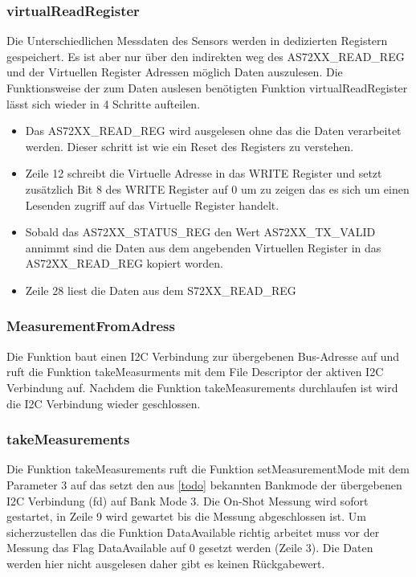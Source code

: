 \subsubsection{virtualReadRegister}
Die Unterschiedlichen Messdaten des Sensors werden in dedizierten Registern gespeichert.
 Es ist aber nur über den indirekten weg des AS72XX\_READ\_REG und der Virtuellen Register Adressen möglich Daten auszulesen.
Die Funktionsweise der zum Daten auslesen benötigten Funktion virtualReadRegister lässt sich wieder in 4 Schritte aufteilen.
\begin{itemize}
	\item Das AS72XX\_READ\_REG wird ausgelesen ohne das die Daten verarbeitet werden. Dieser schritt ist wie ein Reset des Registers zu verstehen.
	\item Zeile 12 schreibt die Virtuelle Adresse in das WRITE Register und setzt zusätzlich Bit 8 des WRITE Register auf 0 um zu zeigen das es sich um einen Lesenden zugriff auf das Virtuelle Register handelt.
	\item Sobald das AS72XX\_STATUS\_REG den Wert AS72XX\_TX\_VALID annimmt sind die Daten aus dem angebenden Virtuellen Register in das AS72XX\_READ\_REG kopiert worden.
	\item Zeile 28 liest die Daten aus dem S72XX\_READ\_REG
\end{itemize}


\subsubsection{MeasurementFromAdress}
Die Funktion baut einen I2C Verbindung zur übergebenen Bus-Adresse auf und  ruft die Funktion takeMeasurments mit dem File Descriptor der aktiven I2C Verbindung auf.
Nachdem die Funktion takeMeasurements durchlaufen ist wird die I2C Verbindung wieder geschlossen.


\subsubsection{takeMeasurements}

Die Funktion takeMeasurements ruft die Funktion setMeasurementMode mit dem Parameter 3 auf das setzt den aus \ref{todo} bekannten Bankmode der übergebenen I2C Verbindung (fd) auf Bank Mode 3.
	Die On-Shot Messung wird sofort gestartet, in Zeile 9 wird gewartet bis die Messung abgeschlossen ist. 
		Um sicherzustellen das die Funktion DataAvailable richtig arbeitet muss vor der Messung das Flag DataAvailable auf 0 gesetzt werden (Zeile 3).
Die Daten werden hier nicht ausgelesen daher gibt es keinen Rückgabewert.\\


